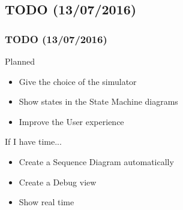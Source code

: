 \documentclass[10pt, svgnames, compress, red]{beamer}
\begin{document}
\subsection{TODO (13/07/2016)}
\begin{frame}[label=todo]
  \frametitle{TODO (13/07/2016)}
  \begin{alertblock}{Planned}
    \begin{itemize}
    \item Give the choice of the simulator
    \item Show states in the State Machine diagrams
    \item Improve the User experience
    \end{itemize}
  \end{alertblock}
  \begin{alertblock}{If I have time...}
    \begin{itemize}
    \item Create a Sequence Diagram automatically
    \item Create a Debug view
    \item Show real time
    \end{itemize}
  \end{alertblock}
  \hyperlink{done}{}
  \transdissolve[duration=0.1]
\end{frame}
\end{document}
